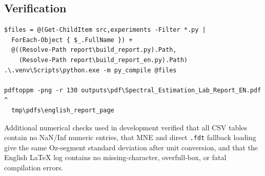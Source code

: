 \documentclass[11pt]{article}
\begin{document}
\subsection{Verification}
\begin{verbatim}
$files = @(Get-ChildItem src,experiments -Filter *.py |
  ForEach-Object { $_.FullName }) +
  @((Resolve-Path report\build_report.py).Path,
    (Resolve-Path report\build_report_en.py).Path)
.\.venv\Scripts\python.exe -m py_compile @files

pdftoppm -png -r 130 outputs\pdf\Spectral_Estimation_Lab_Report_EN.pdf ^
  tmp\pdfs\english_report_page
\end{verbatim}

Additional numerical checks used in development verified that all CSV tables contain no NaN/Inf numeric entries, that MNE and direct \texttt{.fdt} fallback loading give the same Oz-segment standard deviation after unit conversion, and that the English LaTeX log contains no missing-character, overfull-box, or fatal compilation errors.
\end{document}
